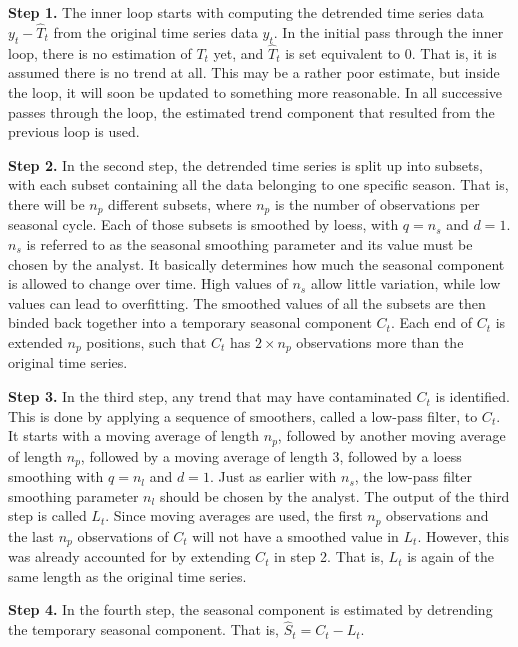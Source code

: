 \documentclass[12pt,oneside]{reedthesis}
\begin{document}
\textbf{Step 1.} The inner loop starts with computing the detrended time
series data \(y_{t} - \hat{T}_{t}\) from the original time series data
\(y_{t}\). In the initial pass through the inner loop, there is no
estimation of \(T_{t}\) yet, and \(\hat{T}_{t}\) is set equivalent to
\(0\). That is, it is assumed there is no trend at all. This may be a
rather poor estimate, but inside the loop, it will soon be updated to
something more reasonable. In all successive passes through the loop,
the estimated trend component that resulted from the previous loop is
used.

\textbf{Step 2.} In the second step, the detrended time series is split
up into subsets, with each subset containing all the data belonging to
one specific season. That is, there will be \(n_{p}\) different subsets,
where \(n_{p}\) is the number of observations per seasonal cycle. Each
of those subsets is smoothed by loess, with \(q = n_{s}\) and \(d = 1\).
\(n_{s}\) is referred to as the seasonal smoothing parameter and its
value must be chosen by the analyst. It basically determines how much
the seasonal component is allowed to change over time. High values of
\(n_{s}\) allow little variation, while low values can lead to
overfitting. The smoothed values of all the subsets are then binded back
together into a temporary seasonal component \(C_{t}\). Each end of
\(C_{t}\) is extended \(n_{p}\) positions, such that \(C_{t}\) has
\(2 \times n_{p}\) observations more than the original time series.

\textbf{Step 3.} In the third step, any trend that may have contaminated
\(C_{t}\) is identified. This is done by applying a sequence of
smoothers, called a low-pass filter, to \(C_{t}\). It starts with a
moving average of length \(n_{p}\), followed by another moving average
of length \(n_{p}\), followed by a moving average of length 3, followed
by a loess smoothing with \(q = n_{l}\) and \(d = 1\). Just as earlier
with \(n_{s}\), the low-pass filter smoothing parameter \(n_{l}\) should
be chosen by the analyst. The output of the third step is called
\(L_{t}\). Since moving averages are used, the first \(n_{p}\)
observations and the last \(n_{p}\) observations of \(C_{t}\) will not
have a smoothed value in \(L_{t}\). However, this was already accounted
for by extending \(C_{t}\) in step 2. That is, \(L_{t}\) is again of the
same length as the original time series.

\textbf{Step 4.} In the fourth step, the seasonal component is estimated
by detrending the temporary seasonal component. That is,
\(\hat{S}_{t} = C_{t} - L_{t}\).
\end{document}
